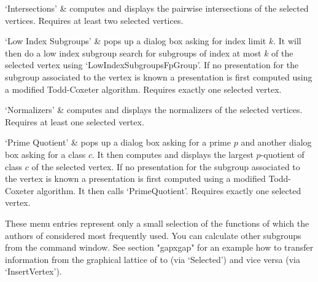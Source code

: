 `Intersections' &
computes and   displays   the pairwise   intersections  of  the  selected
vertices.  Requires at least two selected vertices.

`Low Index Subgroups' &
pops up a dialog box asking for index  limit $k$.  It  will then do a low
index subgroup search for  subgroups of index at  most $k$ of the selected
vertex using `LowIndexSubgroupsFpGroup'.    If no  presentation  for  the
subgroup   associated to  the vertex  is  known a  presentation  is first
computed using a  modified  Todd-Coxeter algorithm. Requires  exactly one
selected vertex.

`Normalizers' &
computes and displays the normalizers of the selected vertices.  Requires
at least one selected vertex.

`Prime Quotient' &
pops up a dialog box asking for a prime $p$ and another dialog box asking
for a class $c$.  It then  computes and displays the largest $p$-quotient
of class $c$ of the selected vertex.  If no presentation for the subgroup
associated to the vertex is known a  presentation is first computed using
a   modified  Todd-Coxeter algorithm.   It    then calls `PrimeQuotient'.
Requires exactly one selected vertex.
\enditems

These menu entries represent only a small selection of the functions of
{\GAP} which the authors of {\XGAP} considered most frequently used. You
can calculate other subgroups from
the {\GAP} command window. See section "gapxgap" for an example how to
transfer information from the graphical lattice of {\XGAP} to {\GAP} (via
`Selected') and vice versa (via `InsertVertex').

%
%
%
%
%
%
%
%
%


